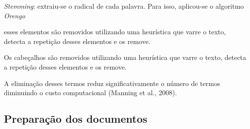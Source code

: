 \textit{Stemming}: extraiu-se o radical de cada palavra. Para isso, aplicou-se o algoritmo \textit{Orengo} %













esses elementos são removidos utilizando uma heurística que varre o texto, detecta a repetição desses elementos e os remove.


Os cabeçalhos são removidos utilizando uma heurística que varre o texto, detecta a repetição desses elementos e os remove.

A eliminação desses termos reduz significativamente o número de termos diminuindo o custo computacional (Manning et al., 2008).































\subsection{Preparação dos documentos}




